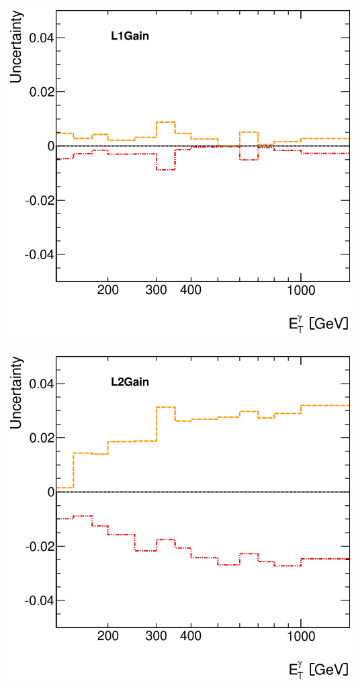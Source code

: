 \documentclass[12pt, twoside]{article}
\numberwithin{equation}{section}
\numberwithin{figure}{section}
\newenvironment{changemargin}[2]{%
\begin{list}{}{%
\setlength{\topsep}{0pt}%
\setlength{\leftmargin}{#1}%
\setlength{\rightmargin}{#2}%
\setlength{\listparindent}{\parindent}%
\setlength{\itemindent}{\parindent}%
\setlength{\parsep}{\parskip}%
}%
\item[]}{\end{list}}
\begin{document}
\begin{figure}[H]
\begin{changemargin}{-1.0cm}{-0.75cm}
\begin{changemargin}{-0.75cm}{-1.0cm}
        \begin{subfigure}[b]{0.27\textwidth}
            \includegraphics[width=\textwidth]{./images/PhotonSystematics/PhotonSystematic-5.eps}
        \end{subfigure}
        \begin{subfigure}[b]{0.27\textwidth}
            \includegraphics[width=\textwidth]{./images/PhotonSystematics/PhotonSystematic-6.eps}

\end{subfigure}
\end{changemargin}
\end{changemargin}
\end{figure}
\end{document}
